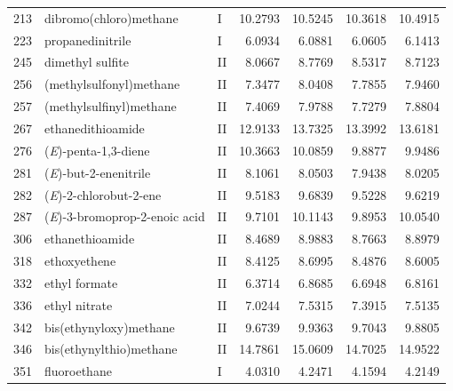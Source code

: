 \begin{longtable}{rlld{2.5}d{2.5}d{2.5}d{2.5}}
    213  & dibromo(chloro)methane                                 & I  & 10.2793 & 10.5245 & 10.3618 & 10.4915 \\
    223  & propanedinitrile                                       & I  & 6.0934  & 6.0881  & 6.0605  & 6.1413  \\
    245  & dimethyl sulfite                                       & II & 8.0667  & 8.7769  & 8.5317  & 8.7123  \\
    256  & (methylsulfonyl)methane                                & II & 7.3477  & 8.0408  & 7.7855  & 7.9460  \\
    257  & (methylsulfinyl)methane                                & II & 7.4069  & 7.9788  & 7.7279  & 7.8804  \\
    267  & ethanedithioamide                                      & II & 12.9133 & 13.7325 & 13.3992 & 13.6181 \\
    276  & (\textit{E})-penta-1,3-diene                           & II & 10.3663 & 10.0859 & 9.8877  & 9.9486  \\
    281  & (\textit{E})-but-2-enenitrile                          & II & 8.1061  & 8.0503  & 7.9438  & 8.0205  \\
    282  & (\textit{E})-2-chlorobut-2-ene                         & II & 9.5183  & 9.6839  & 9.5228  & 9.6219  \\
    287  & (\textit{E})-3-bromoprop-2-enoic   acid                & II & 9.7101  & 10.1143 & 9.8953  & 10.0540 \\
    306  & ethanethioamide                                        & II & 8.4689  & 8.9883  & 8.7663  & 8.8979  \\
    318  & ethoxyethene                                           & II & 8.4125  & 8.6995  & 8.4876  & 8.6005  \\
    332  & ethyl formate                                          & II & 6.3714  & 6.8685  & 6.6948  & 6.8161  \\
    336  & ethyl nitrate                                          & II & 7.0244  & 7.5315  & 7.3915  & 7.5135  \\
    342  & bis(ethynyloxy)methane                                 & II & 9.6739  & 9.9363  & 9.7043  & 9.8805  \\
    346  & bis(ethynylthio)methane                                & II & 14.7861 & 15.0609 & 14.7025 & 14.9522 \\
    351  & fluoroethane                                           & I  & 4.0310  & 4.2471  & 4.1594  & 4.2149  \\

\end{longtable}
